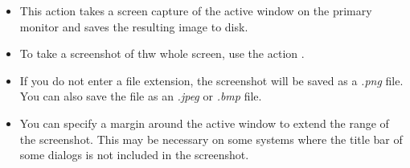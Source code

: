 
\begin{itemize}
\item This action takes a screen capture of the active window on the primary monitor and saves the resulting image to disk.
\item To take a screenshot of thw whole screen, use the action . 
\item If you do not enter a file extension, the screenshot will be saved as a \emph{.png} file. You can also save the file as an \emph{.jpeg} or \emph{.bmp} file.
\item You can specify a margin around the active window to extend the range of the screenshot. This may be necessary on some systems where the title bar of some dialogs is not included in the screenshot. 
\end{itemize}
